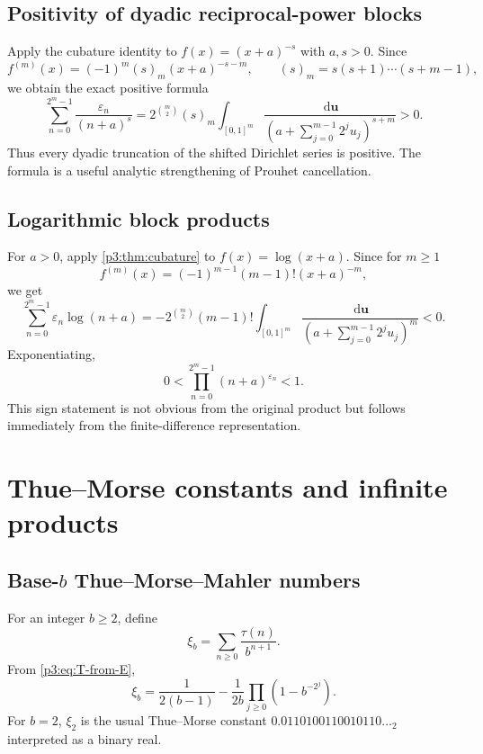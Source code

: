 \documentclass[11pt,oneside]{article}
\theoremstyle{definition}
\theoremstyle{remark}
\newcommand{\dd}{\,\mathrm d}
\newcommand{\eps}{\varepsilon}
\begin{document}
\subsection{Positivity of dyadic reciprocal-power blocks}

Apply the cubature identity to $f(x)=(x+a)^{-s}$ with $a,s>0$.  Since
\[
 f^{(m)}(x)=(-1)^m(s)_m(x+a)^{-s-m},
 \qquad (s)_m=s(s+1)\cdots(s+m-1),
\]
we obtain the exact positive formula
\begin{equation}\label{p3:eq:positive-reciprocal-block}
 \boxed{\quad
 \sum_{n=0}^{2^m-1}\frac{\eps_n}{(n+a)^s}
 =2^{\binom m2}(s)_m
 \int_{[0,1]^m}
 \frac{\dd\mathbf u}
 {(a+\sum_{j=0}^{m-1}2^ju_j)^{s+m}}>0.
 \quad}
\end{equation}
Thus every dyadic truncation of the shifted Dirichlet series is positive.  The
formula is a useful analytic strengthening of Prouhet cancellation.

\subsection{Logarithmic block products}

For $a>0$, apply \cref{p3:thm:cubature} to $f(x)=\log(x+a)$.  Since for $m\ge1$
\[
 f^{(m)}(x)=(-1)^{m-1}(m-1)!(x+a)^{-m},
\]
we get
\begin{equation}\label{p3:eq:finite-log-block}
 \sum_{n=0}^{2^m-1}\eps_n\log(n+a)
 =-2^{\binom m2}(m-1)!
 \int_{[0,1]^m}
 \frac{\dd\mathbf u}
 {(a+\sum_{j=0}^{m-1}2^ju_j)^m}<0.
\end{equation}
Exponentiating,
\begin{equation}\label{p3:eq:finite-product-less-one}
 0<\prod_{n=0}^{2^m-1}(n+a)^{\eps_n}<1.
\end{equation}
This sign statement is not obvious from the original product but follows
immediately from the finite-difference representation.

\section{Thue--Morse constants and infinite products}

\subsection{\texorpdfstring{Base-$b$}{Base-b} Thue--Morse--Mahler numbers}

For an integer $b\ge2$, define
\begin{equation}\label{p3:eq:xi-b-def}
 \xi_b=\sum_{n\ge0}\frac{\tau(n)}{b^{n+1}}.
\end{equation}
From \cref{p3:eq:T-from-E},
\begin{equation}\label{p3:eq:xi-b-product}
 \boxed{\quad
 \xi_b=\frac1{2(b-1)}
 -\frac1{2b}\prod_{j\ge0}\left(1-b^{-2^j}\right).
 \quad}
\end{equation}
For $b=2$, $\xi_2$ is the usual Thue--Morse constant
$0.0110100110010110\ldots_2$ interpreted as a binary real.
\end{document}
